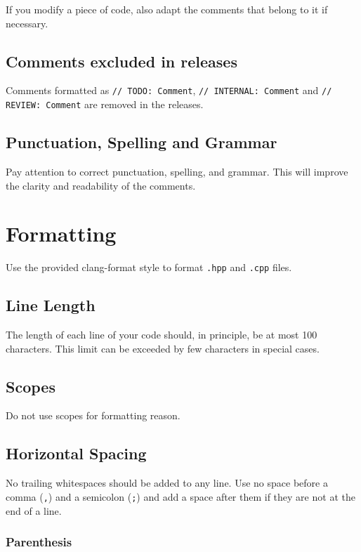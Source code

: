 \documentclass[a4paper]{article}
\newcommand{\inlinecode}[1]{\lstinline|#1|}
\begin{document}
If you modify a piece of code, also adapt the comments that belong to it if necessary.

\subsection{Comments excluded in releases}

Comments formatted as \inlinecode{// TODO: Comment}, \inlinecode{// INTERNAL: Comment} and \inlinecode{// REVIEW: Comment} are removed in the releases.

\subsection{Punctuation, Spelling and Grammar}

Pay attention to correct punctuation, spelling, and grammar. This will improve the clarity and readability of the comments.

\section{Formatting}

Use the provided clang-format style to format \verb|.hpp| and \verb|.cpp| files.

\subsection{Line Length}

The length of each line of your code should, in principle, be at most 100 characters. This limit can be exceeded by few characters in special cases.

\subsection{Scopes}

Do not use scopes for formatting reason.

\subsection{Horizontal Spacing}

No trailing whitespaces should be added to any line.
Use no space before a comma (\inlinecode{,}) and a semicolon (\inlinecode{;}) and add a space after them if they are not at the end of a line.

\subsubsection{Parenthesis}
\end{document}
